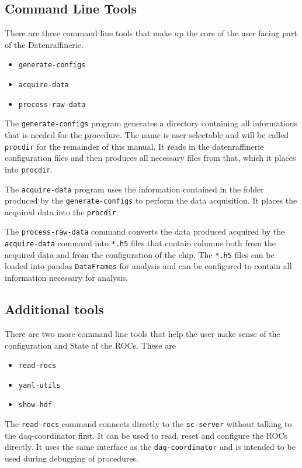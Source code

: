 \documentclass[11pt]{article}
\begin{document}
\subsection{Command Line Tools}
There are three command line tools that make up the core of the user facing part of the Datenraffinerie.
\begin{itemize}
	\item \texttt{generate-configs}
	\item \texttt{acquire-data}
	\item 	\texttt{process-raw-data}
\end{itemize}

The \texttt{generate-configs} program generates a directory containing all informations that is needed for the procedure. The name is user selectable and will be called \texttt{procdir} for the remainder of this manual. It reads in the datenraffinerie configuration files and then produces all necessary files from that, which it places into \texttt{procdir}.

The \texttt{acquire-data} program uses the information contained in the folder produced by the \texttt{generate-configs} to perform the data acquisition. It places the acquired data into the \texttt{procdir}.

The \texttt{process-raw-data} command converts the data produced acquired by the \texttt{acquire-data} command into \texttt{*.h5} files that contain columns both from the acquired data and from the configuration of the chip. The \texttt{*.h5} files can be loaded into pandas \texttt{DataFrames} for analysis and can be configured to contain all information necessary for analysis. 

\subsection{Additional tools}
There are two more command line tools that help the user make sense of the configuration and State of the ROCs. These are
\begin{itemize}
	\item \texttt{read-rocs}
	\item \texttt{yaml-utils}
	\item \texttt{show-hdf}
\end{itemize}  
The \texttt{read-rocs} command connects directly to the \texttt{sc-server} without talking to the daq-coordinator first. It can be used to read, reset and configure the ROCs directly. It uses the same interface as the \texttt{daq-coordinator} and is intended to be used during debugging of procedures.
\end{document}
